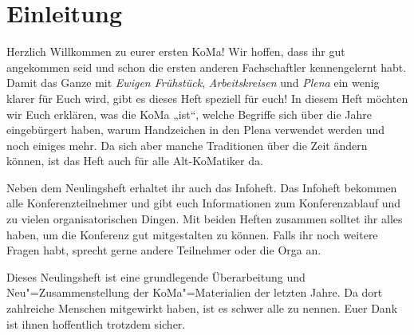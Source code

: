 \chapter{Einleitung}

Herzlich Willkommen zu eurer ersten KoMa!
Wir hoffen, dass ihr gut angekommen seid und schon die ersten anderen Fachschaftler kennengelernt habt.
Damit das Ganze mit \emph{Ewigen Frühstück}, \emph{Arbeitskreisen} und \emph{Plena} ein wenig klarer für Euch wird,
gibt es dieses Heft speziell für euch!
In diesem Heft möchten wir Euch erklären, was die KoMa „ist“, welche Begriffe sich über die Jahre eingebürgert haben,
warum Handzeichen in den Plena verwendet werden und noch einiges mehr.
Da sich aber manche Traditionen über die Zeit ändern können, ist das Heft auch für alle Alt-KoMatiker da.

Neben dem Neulingsheft erhaltet ihr auch das Infoheft.
Das Infoheft bekommen alle Konferenzteilnehmer und gibt euch Informationen zum Konferenzablauf und zu vielen organisatorischen Dingen.
Mit beiden Heften zusammen solltet ihr alles haben, um die Konferenz gut mitgestalten zu können.
Falls ihr noch weitere Fragen habt, sprecht gerne andere Teilnehmer oder die Orga an.

Dieses Neulingsheft ist eine grundlegende Überarbeitung und Neu"=Zusammenstellung der KoMa"=Materialien der letzten Jahre. %
Da dort zahlreiche Menschen mitgewirkt haben, ist es schwer alle zu nennen. Euer Dank ist ihnen hoffentlich trotzdem sicher.

